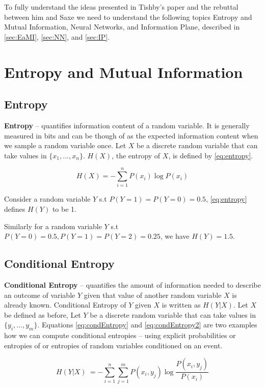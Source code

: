 \documentclass[dissertation.tex]{subfiles}
\begin{document}
To fully understand the ideas presented in Tishby's paper and the
rebuttal between him and Saxe we need to understand the
following topics Entropy and Mutual Information, Neural Networks, and
Information Plane, described in \autoref{sec:EaMI}, \autoref{sec:NN}, and
\autoref{sec:IP}.

\section{Entropy and Mutual Information}
\label{sec:EaMI}

\subsection{Entropy}
\textbf{Entropy} -- quantifies information content of a random variable. It is
generally measured in bits and can be though of as the expected information
content when we sample a random variable once. Let $X$ be a discrete random
variable that can take values in $\{x_1,...,x_n\}$. $H(X)$, the entropy of
$X$, is defined by \autoref{eq:entropy}.

\begin{equation}
  H(X)=-\sum _{i=1}^{n}{P (x_i)\log P(x_i)}
\label{eq:entropy}
\end{equation}

Consider a random variable $Y$ s.t $P(Y=1) = P(Y=0) = 0.5$, \autoref{eq:entropy}
defines $H(Y)$ to be 1.

Similarly for a random variable $Y$ s.t $P(Y=0) = 0.5, P(Y=1) = P(Y=2) = 0.25$,
we have $H(Y) = 1.5$.

\subsection{Conditional Entropy}
\textbf{Conditional Entropy} -- quantifies the amount of information needed to
describe an outcome of variable $Y$ given that value of another random variable
$X$ is already known. Conditional Entropy of $Y$ given $X$ is written as
$H(Y|X)$. Let $X$ be defined as before, Let $Y$ be a discrete random variable
that can take values in $\{y_i,...,y_m\}$. Equations \ref{eq:condEntropy} and
\ref{eq:condEntropy2} are two examples how we can compute conditional entropies
-- using explicit probabilities or entropies of or entropies of random variables
conditioned on an event.

\begin{equation}
H(Y|X)\ =-\sum _{i=1}^n\sum _{j=1}^mP(x_i,y_j)\log {\frac {P(x_i,y_j)}{P(x_i)}}
\label{eq:condEntropy}
\end{equation}
\end{document}
